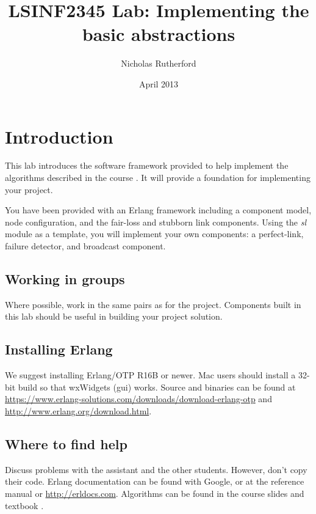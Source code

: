 \documentclass[a4paper]{article}
\title{LSINF2345 Lab: Implementing the basic abstractions}
\author{Nicholas Rutherford}
\date{April 2013}
\begin{document}
\ifpdf
{}
\else
{}
\fi

\maketitle


\section{Introduction}

This lab introduces the software framework provided to help
implement the algorithms described in the course \cite{cachin2011}.
It will provide a foundation for implementing your project.

You have been provided with an Erlang framework including a component model,
node configuration, and the fair-loss and stubborn link components. Using the
\emph{sl} module as a template, you will implement your own components: a
perfect-link, failure detector, and broadcast component.

\subsection{Working in groups} %
\label{sub:how_to_work}

Where possible, work in the same pairs as for the project. Components built in
this lab should be useful in building your project solution.


\subsection{Installing Erlang} %
\label{sub:installing_erlang}

We suggest installing Erlang/OTP R16B or newer. Mac users should install
a 32-bit build so that wxWidgets (gui) works. Source and binaries can be found at
\url{https://www.erlang-solutions.com/downloads/download-erlang-otp} and
\url{http://www.erlang.org/download.html}.


\subsection{Where to find help} %
\label{sub:where_to_find_help}

Discuss problems with the assistant and the other students. However, don't
copy their code. Erlang documentation can be found with Google, or at the
reference
manual \cite{manual_stdlib}\cite{manual_expressions} or
\url{http://erldocs.com}. Algorithms can be found in the course slides and
textbook \cite{cachin2011}.
\end{document}
